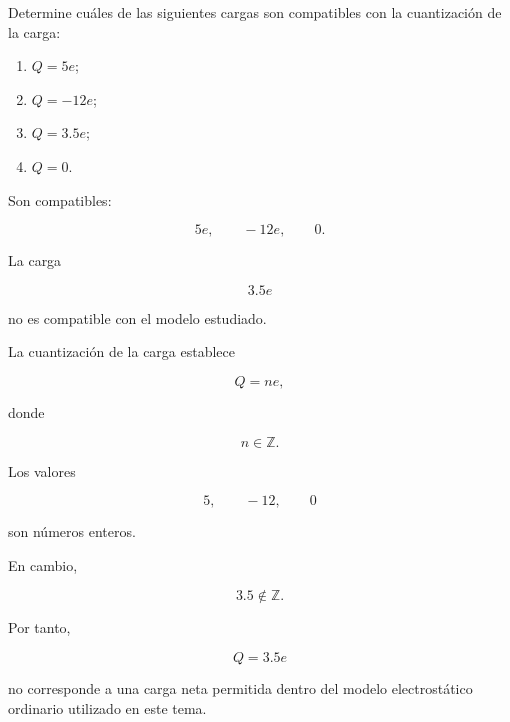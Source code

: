 
\begin{ejercicio}

Determine cuáles de las siguientes cargas son compatibles con la
cuantización de la carga:

\begin{enumerate}
    \item \(Q=5e\);
    \item \(Q=-12e\);
    \item \(Q=3.5e\);
    \item \(Q=0\).
\end{enumerate}

\end{ejercicio}

\begin{respuesta}

Son compatibles:

\[
\boxed{
5e,\qquad -12e,\qquad 0
}.
\]

La carga

\[
\boxed{
3.5e
}
\]

no es compatible con el modelo estudiado.

\end{respuesta}

\begin{explicacion}

La cuantización de la carga establece

\[
Q=ne,
\]

donde

\[
n\in\mathbb{Z}.
\]

Los valores

\[
5,\qquad -12,\qquad 0
\]

son números enteros.

En cambio,

\[
3.5\notin\mathbb{Z}.
\]

Por tanto,

\[
Q=3.5e
\]

no corresponde a una carga neta permitida dentro del modelo electrostático
ordinario utilizado en este tema.

\end{explicacion}



